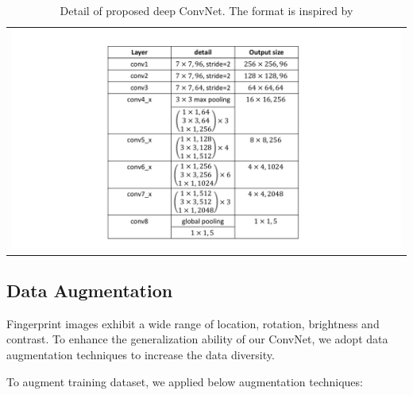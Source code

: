 \begin{table}[!ht]
	\centering
	\caption{Detail of proposed deep ConvNet. The format is inspired by \cite{he2016deep}}
	\label{tab.cnn_params}
	\begin{tabular}{l}
		\includegraphics[scale=0.45,clip=true,trim = 78mm 5mm 70mm 5mm]{fig/figs/cnn_table.pdf}
	\end{tabular}
\end{table}

\subsection{Data Augmentation}
\label{sec-dataAug}
Fingerprint images exhibit a wide range of location, rotation, brightness and contrast. To enhance the generalization ability of our ConvNet, we adopt data augmentation techniques to increase the data diversity.
	
To augment training dataset, we applied below augmentation techniques:

